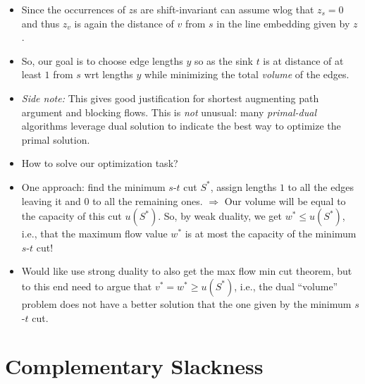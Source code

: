 \documentclass{article}
\begin{document}
\begin{itemize}
\item Since the occurrences of $z$s are shift-invariant can assume wlog that $z_s=0$ and thus $z_v$ is again the distance of $v$ from $s$ in the line embedding given by $z$. 
\item So, our goal is to choose edge lengths $y$ so as the sink $t$ is at distance of at least $1$ from $s$ wrt lengths $y$ while minimizing the total {\em volume} of the edges. 
\item {\em Side note:} This gives good justification for shortest augmenting path argument and blocking flows. This is {\em not} unusual: many \emph{primal-dual} algorithms leverage dual solution to indicate the best way to optimize the primal solution. 
\item How to solve our optimization task? 
\item One approach: find the minimum $s$-$t$ cut $S^*$, assign lengths $1$ to all the edges leaving it and $0$ to all the remaining ones. 
$\Rightarrow$ Our volume will be equal to the capacity of this cut $u(S^*)$. So, by weak duality, we get $w^*\leq u(S^*)$, i.e.,  that the maximum flow value $w^*$ is at most the capacity of the minimum $s$-$t$ cut!
\item Would like use strong duality to also get the max flow min cut theorem, but to this end need to argue that $v^*=w^*\geq u(S^*)$, i.e., the dual ``volume'' problem does not have a better solution that the one given by the minimum $s$-$t$ cut. 
\end{itemize}


\section{Complementary Slackness}
\end{document}
